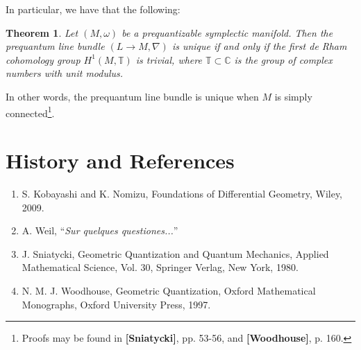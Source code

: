 \documentclass{tufte-handout}
\newtheorem{thrm}{Theorem}
\begin{document}
In particular, we have that the following:
\begin{thrm}
Let $(M,\omega)$ be a prequantizable symplectic manifold. Then the prequantum line bundle $(L\to M, \nabla)$ is unique if and only if the first de Rham cohomology group $H^1(M,\mathbb{T})$ is trivial, where $\mathbb{T} \subset \mathbb{C}$ is the group of complex numbers with unit modulus.
\end{thrm}
In other words, the prequantum line bundle is unique when $M$ is simply connected\footnote{Proofs may be found in \textbf{[Sniatycki]}, pp. 53-56, and \textbf{[Woodhouse]}, p. 160.}. %


\section{History and References}
\begin{enumerate}
\item S. Kobayashi and K. Nomizu, Foundations of Differential Geometry, Wiley, 2009.

\item A. Weil, ``\emph{Sur quelques questiones...}'' %

\item J. Sniatycki, Geometric Quantization and Quantum Mechanics, Applied Mathematical Science, Vol. 30, Springer Verlag, New York, 1980.

\item N. M. J. Woodhouse, Geometric Quantization, Oxford Mathematical Monographs, Oxford University Press, 1997.
\end{enumerate}
\end{document}

